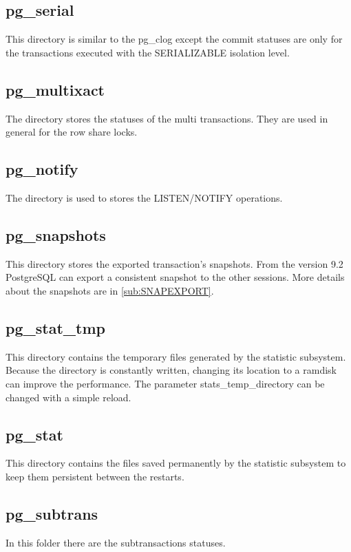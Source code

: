 \subsection{pg\_serial}
This directory is similar to the pg\_clog except the commit statuses are only for the transactions
executed with the  SERIALIZABLE isolation level.

\subsection{pg\_multixact}
The directory stores the statuses of the multi transactions. They are used in general for the
row share locks.

\subsection{pg\_notify}
The directory is used to stores the LISTEN/NOTIFY operations.

\subsection{pg\_snapshots}
This directory stores the exported transaction's snapshots. From the version 9.2 PostgreSQL
can export a consistent snapshot to the other sessions. More details about the snapshots are in
\ref{sub:SNAPEXPORT}.


\subsection{pg\_stat\_tmp}
This directory contains the temporary files generated by the statistic subsystem. 
Because the directory is constantly written, changing its location to a ramdisk can improve the
performance. The parameter stats\_temp\_directory can be changed with a simple reload.

\subsection{pg\_stat}
This directory contains the files saved permanently by the statistic subsystem to keep them
persistent between the restarts. 

\subsection{pg\_subtrans}
In this folder there are the subtransactions statuses. 

